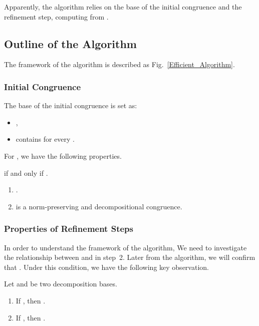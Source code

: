 \documentclass{llncs}
\begin{document}
Apparently, the algorithm relies on the base  of the initial congruence  and the refinement step, computing  from .

\subsection{Outline of the Algorithm}\label{subsec:naive-algorithm}

The framework of the algorithm is described as Fig.~\ref{Efficient_Algorithm}.









\subsubsection{Initial Congruence}

The base  of the initial congruence  is set as:
\begin{itemize}
\item
,

\item
 contains  for every .
\end{itemize}

For  , we have the following properties.
\begin{lemma}
   if and only if .
\end{lemma}

\begin{lemma}
\begin{enumerate}
\item
.

\item
 is a norm-preserving and decompositional congruence.
\end{enumerate}
\end{lemma}



\subsubsection{Properties of Refinement Steps}
In order to understand the framework of the algorithm,
We need to investigate the relationship between   and   in step~2.  Later from the algorithm, we will confirm that . Under this condition,  we have the following key observation.
\begin{lemma}\label{lem:PP}
Let   and   be two decomposition bases.
\begin{enumerate}
\item
If  , then  .

\item
If , then .
\end{enumerate}
\end{lemma}
\end{document}
